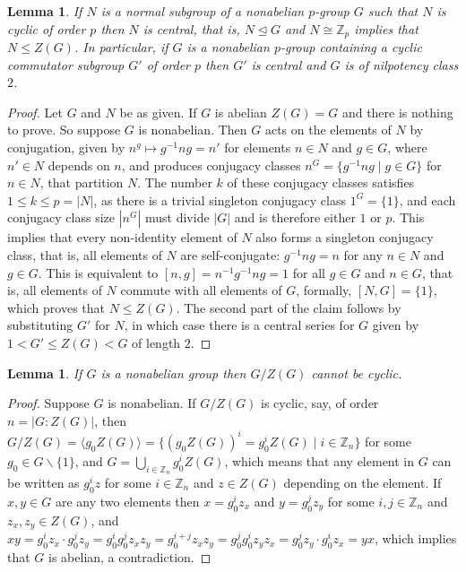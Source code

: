 \documentclass{amsart}
\theoremstyle{observation}
\newtheorem{lemma}[theorem]{Lemma}
\theoremstyle{definition}
\theoremstyle{remark}
\numberwithin{equation}{section}
\begin{document}
\begin{lemma}\label{LemCycNormSubOrderp} If $N$ is a normal subgroup of a nonabelian $p$-group $G$ such that $N$ is cyclic of order $p$ then $N$ is central, that is, $N \trianglelefteq G$ and $N \cong \mathbb{Z}_p$ implies that $N \leq Z(G)$. In particular, if $G$ is a nonabelian $p$-group containing a cyclic commutator subgroup $G'$ of order $p$ then $G'$ is central and $G$ is of nilpotency class $2$.
\end{lemma}
\begin{proof} Let $G$ and $N$ be as given. If $G$ is abelian $Z(G) = G$ and there is nothing to prove. So suppose $G$ is nonabelian. Then $G$ acts on the elements of $N$ by conjugation, given by $n^g \longmapsto g^{-1}ng = n'$ for elements $n \in N$ and $g \in G$, where $n' \in N$ depends on $n$, and produces conjugacy classes $n^G = \{g^{-1}ng \mathrel | g \in G\}$ for $n \in N$, that partition $N$. The number $k$ of these conjugacy classes satisfies $1 \leq k \leq p = |N|$, as there is a trivial singleton conjugacy class $1^G = \{1\}$, and each conjugacy class size $|n^G|$ must divide $|G|$ and is therefore either $1$ or $p$. This implies that every non-identity element of $N$ also forms a singleton conjugacy class, that is, all elements of $N$ are self-conjugate: $g^{-1}ng = n$ for any $n \in N$ and $g \in G$. This is equivalent to $[n, g] = n^{-1}g^{-1}ng = 1$ for all $g \in G$ and $n \in G$, that is, all elements of $N$ commute with all elements of $G$, formally, $[N, G] = \{1\}$, which proves that $N \leq Z(G)$. The second part of the claim follows by substituting $G'$ for $N$, in which case there is a central series for $G$ given by $1 < G' \leq Z(G) < G$ of length $2$.
\end{proof}

\begin{lemma}\label{LemNonAbCentQuo} If $G$ is a nonabelian group then $G/Z(G)$ cannot be cyclic.
\end{lemma}
\begin{proof}
Suppose $G$ is nonabelian. If $G/Z(G)$ is cyclic, say, of order $n = |G:Z(G)|$, then $G/Z(G) = \langle g_0Z(G) \rangle = \{(g_0Z(G))^i = g_0^iZ(G) \mathrel | i \in \mathbb{Z}_n\}$ for some $g_0 \in G\backslash\{1\}$, and $G = \bigcup_{i \in \mathbb{Z}_n}g_0^iZ(G)$, which means that any element in $G$ can be written as $g_0^iz$ for some $i \in \mathbb{Z}_n$ and $z \in Z(G)$ depending on the element. If $x, y \in G$ are any two elements then $x = g_0^iz_x$ and $y = g_0^jz_y$ for some $i, j \in \mathbb{Z}_n$ and $z_x, z_y \in Z(G)$, and $xy = g_0^iz_x \cdot g_0^jz_y = g_0^ig_0^jz_xz_y = g_0^{i + j}z_xz_y = g_0^jg_0^iz_yz_x = g_0^jz_y \cdot g_0^iz_x = yx$, which implies that $G$ is abelian, a contradiction.
\end{proof}
\end{document}
